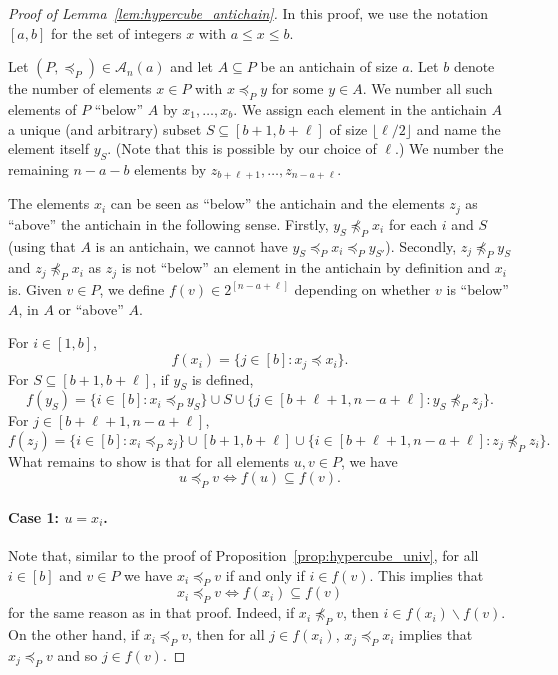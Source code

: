 \documentclass[11pt]{article}
\newcommand{\1}{\mathbbm{1}}
\let\setminus=\smallsetminus
\def\cleq{\preccurlyeq}
\begin{document}
\begin{proof}[Proof of Lemma~\ref{lem:hypercube_antichain}]
In this proof, we use the notation $[a,b]$ for the set of integers $x$ with $a\leq x\leq b$.

    Let $(P,\cleq_P) \in \mathcal{A}_n(a)$ and let $A \subseteq P$ be an antichain of size $a$. Let $b$ denote the number of elements $x\in P$ with $x\cleq_P y$ for some $y\in A$. We number all such elements of $P$ ``below'' $A$ by $x_1,\dots,x_b$. We assign each element in the antichain $A$ a unique (and arbitrary) subset $S\subseteq [b+1,b+\ell]$ of size $\lfloor \ell/2 \rfloor$ and name the element itself $y_S$. (Note that this is possible by our choice of $\ell$.) We number the remaining $n-a-b$ elements by $z_{b+\ell+1},\dots,z_{n-a+\ell}$.  

    The elements $x_i$ can be seen as ``below'' the antichain and the elements $z_j$ as ``above'' the antichain in the following sense. Firstly, $y_S\not\cleq_P x_i$ for each $i$ and $S$ (using that $A$ is an antichain, we cannot have $y_{S}\cleq_P x_i\cleq_P y_{S'}$). Secondly, $z_j\not\cleq_P y_S$ and $z_j\not\cleq_P x_i$ as $z_j$ is not ``below'' an element in the antichain by definition and $x_i$ is. 
    Given $v \in P$, we define $f(v)\in 2^{[n-a+\ell]}$ depending on whether $v$ is ``below'' $A$, in $A$ or ``above'' $A$.

    For $i\in [1,b]$, 
    \[
    f(x_i)=\{j\in [b]:x_j\preceq x_i\}.
    \]
For $S\subseteq [b+1,b+\ell]$, if $y_S$ is defined, \[
f(y_S)=\{i\in [b]:x_i\cleq_P y_S\}\cup S\cup  \{j\in [b+\ell+1,n-a+\ell]:y_S\not \cleq_P z_j\}.
\]
For $j\in [b+\ell+1,n-a+\ell]$,  \[
f(z_j)=\{i\in [b]:x_i\cleq_P z_j\} \cup [b+1,b+\ell]
\cup 
\{i\in [b+\ell+1,n-a+\ell]:z_j \not \cleq_P z_i\}. 
\]
What remains to show is that for all elements $u,v\in P$, we have
\begin{equation}
    \label{eq:poset_contains}
u\cleq_P v \iff f(u)\subseteq f(v).
\end{equation}

\paragraph{Case 1: $u = x_i$.} Note that, similar to the proof of  Proposition~\ref{prop:hypercube_univ}, for all $i\in [b]$ and $v\in P$ we have $x_i\cleq_P v$ if and only if $i\in f(v)$. This implies that
\[
x_i\cleq_P v \iff f(x_i)\subseteq f(v)
\]
for the same reason as in that proof.
Indeed, if  $x_i\not\cleq_Pv$, then $i\in f(x_i)\setminus f(v)$. On the other hand, if $x_i\cleq_P v$, then for all $j\in f(x_i)$, $x_j\cleq_P x_i$ implies that $x_j\cleq_Pv$  and so $j\in f(v)$. 


\end{proof}
\end{document}
